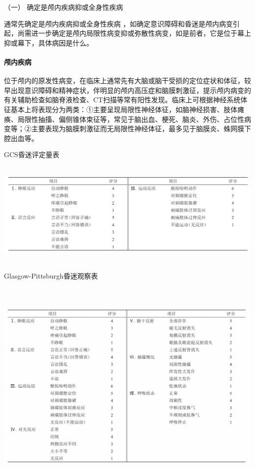 \hypertarget{text00010.htmlux5cux23CHP1-2-2-4-1}{}
（一） 确定是颅内疾病抑或全身性疾病

通常先确定是颅内疾病抑或全身性疾病
，如确定意识障碍和昏迷是颅内病变引起，尚需进一步确定是颅内局限性病变抑或弥散性病变，如是前者，它是位于幕上抑或幕下，具体病因是什么。

\paragraph{颅内疾病}

位于颅内的原发性病变，在临床上通常先有大脑或脑干受损的定位症状和体征，较早出现意识障碍和精神症状，伴明显的颅内高压症和脑膜刺激征，提示颅内病变的有关辅助检查如脑脊液检查、CT扫描等常有阳性发现。临床上可根据神经系统体征基本上将表现分为两类：①主要呈现局限性神经体征，如脑神经损害、肢体瘫痪、局限性抽搐、偏侧锥体束征等，常见于脑出血、梗死、脑炎、外伤、占位性病变等；②主要表现为脑膜刺激征而无局限性神经体征，最多见于脑膜炎、蛛网膜下腔出血等。

\begin{table}[htbp]
\centering
\caption{GCS昏迷评定量表}
\label{tab2-3}
\includegraphics[width=6.66667in,height=2.03125in]{./images/Image00006.jpg}
\end{table}

\begin{table}[htbp]
\centering
\caption{Glasgow-Pittsburgh昏迷观察表}
\label{tab2-4}
\includegraphics[width=6.69792in,height=4.21875in]{./images/Image00007.jpg}
\end{table}


